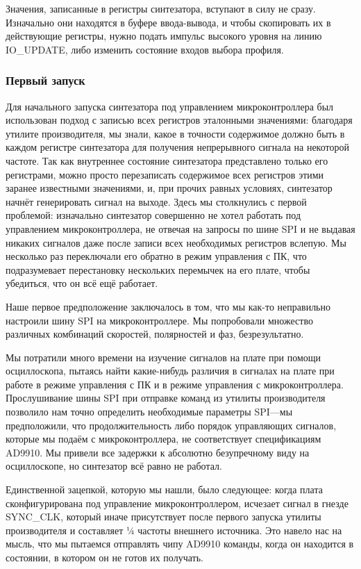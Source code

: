 \documentclass[rusmathsym, eqnumwithinsec, amspack, hyperref]{bomgost}
\begin{document}
Значения, записанные в регистры синтезатора, вступают в силу не сразу. Изначально они находятся в буфере ввода-вывода, и чтобы скопировать их в действующие регистры, нужно подать импульс высокого уровня на линию IO\_UPDATE, либо изменить состояние входов выбора профиля.

\subsubsection{Первый запуск}

Для начального запуска синтезатора под управлением микроконтроллера был использован подход с записью всех регистров эталонными значениями: благодаря утилите производителя, мы знали, какое в точности содержимое должно быть в каждом регистре синтезатора для получения непрерывного сигнала на некоторой частоте. Так как внутреннее состояние синтезатора представлено только его регистрами, можно просто перезаписать содержимое всех регистров этими заранее известными значениями, и, при прочих равных условиях, синтезатор начнёт генерировать сигнал на выходе. Здесь мы столкнулись с первой проблемой: изначально синтезатор совершенно не хотел работать под управлением микроконтроллера, не отвечая на запросы по шине SPI и не выдавая никаких сигналов даже после записи всех необходимых регистров вслепую. Мы несколько раз переключали его обратно в режим управления с ПК, что подразумевает перестановку нескольких перемычек на его плате, чтобы убедиться, что он всё ещё работает.

Наше первое предположение заключалось в том, что мы как-то неправильно настроили шину SPI на микроконтроллере. Мы попробовали множество различных комбинаций скоростей, полярностей и фаз, безрезультатно.

Мы потратили много времени на изучение сигналов на плате при помощи осциллоскопа, пытаясь найти какие-нибудь различия в сигналах на плате при работе в режиме управления с ПК и в режиме управления с микроконтроллера. Прослушивание шины SPI при отправке команд из утилиты производителя позволило нам точно определить необходимые параметры SPI—мы предположили, что продолжительность либо порядок управляющих сигналов, которые мы подаём с микроконтроллера, не соответствует спецификациям AD9910. Мы привели все задержки к абсолютно безупречному виду на осциллоскопе, но синтезатор всё равно не работал.

Единственной зацепкой, которую мы нашли, было следующее: когда плата сконфигурирована под управление микроконтроллером, исчезает сигнал в гнезде SYNC\_CLK, который иначе присутствует после первого запуска утилиты производителя и составляет ¼ частоты внешнего источника. Это навело нас на мысль, что мы пытаемся отправлять чипу AD9910 команды, когда он находится в состоянии, в котором он не готов их получать.
\end{document}
